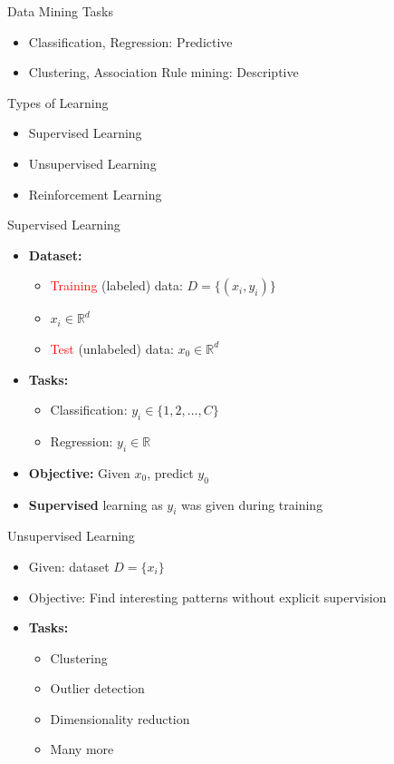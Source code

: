 \documentclass{beamer}
\newcommand{\hred}[1]{{\textcolor{red}{#1}}}
\begin{document}
\begin{frame}{Data Mining Tasks}
    \begin{itemize}
        \item Classification, Regression: Predictive
        \item Clustering, Association Rule mining: Descriptive
    \end{itemize}
\end{frame}

\begin{frame}{Types of Learning}
    \begin{itemize}
        \item Supervised Learning 
        \item Unsupervised Learning
        \item Reinforcement Learning
    \end{itemize}
\end{frame}


\begin{frame}{Supervised Learning}
    \begin{itemize}
        \item {\bf Dataset:} 
        \begin{itemize}
            \item \hred{Training} (labeled) data: $D = \{ (x_i, y_i) \}$
            \item $x_i \in \mathbb{R}^d$
            \item \hred{Test} (unlabeled) data: $x_0 \in \mathbb{R}^d$
        \end{itemize}
        \item {\bf Tasks:}
        \begin{itemize}
            \item Classification: $y_i \in \{1, 2, \ldots, C\}$
            \item Regression: $y_i \in \mathbb{R}$
        \end{itemize}
        \item {\bf Objective:} Given $x_0$, predict $y_0$
        \item {\bf Supervised} learning as $y_i$ was given during training
    \end{itemize}
\end{frame}


\begin{frame}{Unsupervised Learning}
    \begin{itemize}
        \item Given: dataset $D = \{x_i\}$
        \item Objective: Find interesting patterns without explicit supervision
        \item {\bf Tasks:}
        \begin{itemize}
            \item Clustering
            \item Outlier detection
            \item Dimensionality reduction
            \item Many more
        \end{itemize}
    \end{itemize}
\end{frame}
\end{document}
